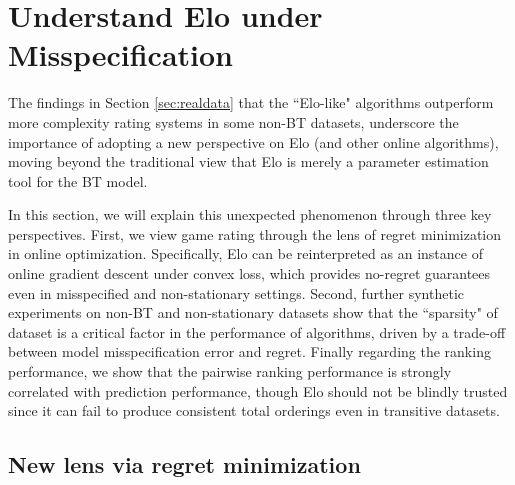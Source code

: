 \section{Understand Elo under Misspecification}

The findings in Section \ref{sec:realdata} that the ``Elo-like" algorithms outperform more complexity rating systems in some non-BT datasets, underscore the importance of adopting a new perspective on Elo (and other online algorithms), moving beyond the traditional view that Elo is merely a parameter estimation tool for the BT model.

In this section, we will explain this unexpected phenomenon through three key perspectives. First, we view game rating through the lens of regret minimization in online optimization. Specifically, Elo can be reinterpreted as an instance of online gradient descent under convex loss, which provides no-regret guarantees even in misspecified and non-stationary settings. Second, further synthetic experiments on non-BT and non-stationary datasets show that the ``sparsity" of dataset is a critical factor in the performance of algorithms, driven by a trade-off between model misspecification error and regret. Finally regarding the ranking performance, we show that the pairwise ranking performance is strongly correlated with prediction performance, though Elo should not be blindly trusted since it can fail to produce consistent total orderings even in transitive datasets.

\subsection{New lens via regret minimization}
\label{sec:OCO}





